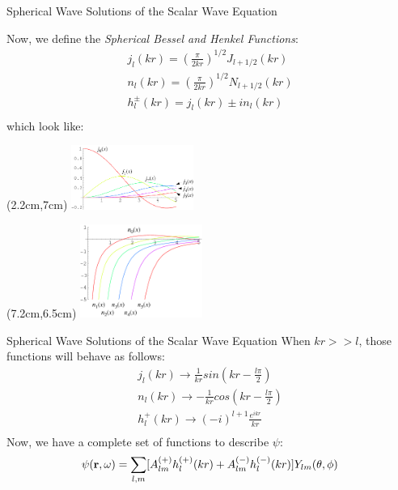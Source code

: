 \documentclass[10pt]{beamer}
\begin{document}
\begin{frame}[fragile]{Spherical Wave Solutions of the Scalar Wave Equation}

Now, we define the \emph{Spherical Bessel and Henkel Functions}:
  \begin{equation*}
    \begin{split}
      j_l(kr)=\left(\frac{\pi}{2kr}\right)^{1/2}J_{l+1/2}(kr)\\
      n_l(kr)=\left(\frac{\pi}{2kr}\right)^{1/2}N_{l+1/2}(kr)\\
      h_l^{\pm}(kr)=j_l(kr)\pm i n_l(kr)\\
    \end{split}
  \end{equation*}
which look like:
        \begin{textblock*}{3cm}(2.2cm,7cm)
        \includegraphics[width=4cm]{besselesf1}
        \end{textblock*}
        \begin{textblock*}{3cm}(7.2cm,6.5cm)
        \includegraphics[width=4cm]{besselesf2}
        \end{textblock*}

\end{frame}


\begin{frame}[fragile]{Spherical Wave Solutions of the Scalar Wave Equation}
    When $kr>>l$, those functions will behave as follows:
      \begin{equation*}
        \begin{split}
          j_l(kr)\rightarrow \frac{1}{kr}sin\left(kr-\frac{l\pi}{2}\right)\\
          n_l(kr)\rightarrow -\frac{1}{kr}cos\left(kr-\frac{l\pi}{2}\right)\\
          h_l^{+}(kr)\rightarrow (-i)^{l+1} \frac{e^{ikr}}{kr}\\
        \end{split}
      \end{equation*}
Now, we have a complete set of functions to describe $\psi$:
      \begin{equation*}
          \psi({\bf r},\omega)=\sum_{l,m} [A^{(+)}_{lm}h^{(+)}_l(kr) + A^{(-)}_{lm}h^{(-)}_l(kr)]Y_{lm}(\theta,\phi)
      \end{equation*}

\end{frame}
\end{document}
